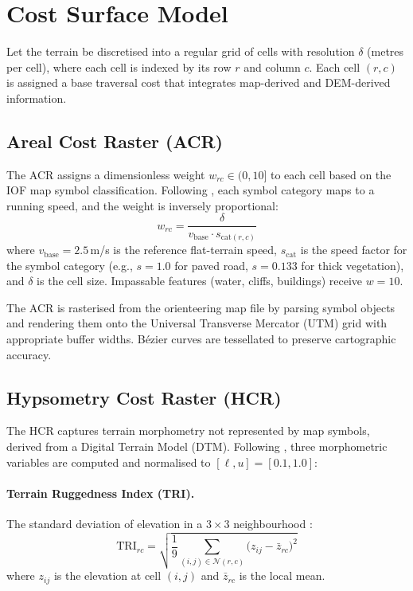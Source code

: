 \documentclass[11pt,a4paper]{article}
\begin{document}
\section{Cost Surface Model}
\label{sec:cost}

Let the terrain be discretised into a regular grid of cells with resolution $\delta$ (metres per cell), where each cell is indexed by its row $r$ and column $c$.
Each cell $(r,c)$ is assigned a base traversal cost that integrates map-derived and DEM-derived information.

\subsection{Areal Cost Raster (ACR)}
\label{sec:acr}

The ACR assigns a dimensionless weight $w_{rc} \in (0, 10]$ to each cell based on the IOF map symbol classification.
Following \citet{ica2021lcp}, each symbol category maps to a running speed, and the weight is inversely proportional:
\begin{equation}
  w_{rc} = \frac{\delta}{v_{\text{base}} \cdot s_{\text{cat}(r,c)}}
  \label{eq:acr}
\end{equation}
where $v_{\text{base}} = 2.5$\,m/s is the reference flat-terrain speed, $s_{\text{cat}}$ is the speed factor for the symbol category (e.g., $s = 1.0$ for paved road, $s = 0.133$ for thick vegetation), and $\delta$ is the cell size.
Impassable features (water, cliffs, buildings) receive $w = 10$.

The ACR is rasterised from the orienteering map file by parsing symbol objects and rendering them onto the Universal Transverse Mercator (UTM) grid with appropriate buffer widths.
B\'{e}zier curves are tessellated to preserve cartographic accuracy.

\subsection{Hypsometry Cost Raster (HCR)}
\label{sec:hcr}

The HCR captures terrain morphometry not represented by map symbols, derived from a Digital Terrain Model (DTM).
Following \citet{ica2021lcp}, three morphometric variables are computed and normalised to $[\ell, u] = [0.1, 1.0]$:

\paragraph{Terrain Ruggedness Index (TRI).}
The standard deviation of elevation in a $3 \times 3$ neighbourhood \citep{riley1999tri}:
\begin{equation}
  \text{TRI}_{rc} = \sqrt{\frac{1}{9}\sum_{(i,j) \in \mathcal{N}(r,c)} \bigl(z_{ij} - \bar{z}_{rc}\bigr)^2}
  \label{eq:tri}
\end{equation}
where $z_{ij}$ is the elevation at cell $(i,j)$ and $\bar{z}_{rc}$ is the local mean.
\end{document}
